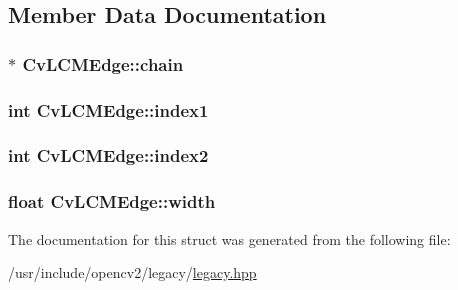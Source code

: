 \subsection{Member Data Documentation}
\hypertarget{structCvLCMEdge_a8f47f175067ef42be19e9781adc5299b}{
\subsubsection[{chain}]{$\ast$ Cv\-L\-C\-M\-Edge\-::chain}}\label{structCvLCMEdge_a8f47f175067ef42be19e9781adc5299b}
\hypertarget{structCvLCMEdge_a19882fbafe5b891442ab22e062cbf3cb}{
\subsubsection[{index1}]{\setlength{\rightskip}{0pt plus 5cm}int Cv\-L\-C\-M\-Edge\-::index1}}\label{structCvLCMEdge_a19882fbafe5b891442ab22e062cbf3cb}
\hypertarget{structCvLCMEdge_a6ec313d5a401998156b8f58e203c4fc8}{
\subsubsection[{index2}]{\setlength{\rightskip}{0pt plus 5cm}int Cv\-L\-C\-M\-Edge\-::index2}}\label{structCvLCMEdge_a6ec313d5a401998156b8f58e203c4fc8}
\hypertarget{structCvLCMEdge_a019d5f8b6bfa42e85f385114abd24c30}{
\subsubsection[{width}]{\setlength{\rightskip}{0pt plus 5cm}float Cv\-L\-C\-M\-Edge\-::width}}\label{structCvLCMEdge_a019d5f8b6bfa42e85f385114abd24c30}


The documentation for this struct was generated from the following file\-:\begin{DoxyCompactItemize}
\item 
/usr/include/opencv2/legacy/\hyperlink{legacy_8hpp}{legacy.\-hpp}\end{DoxyCompactItemize}
